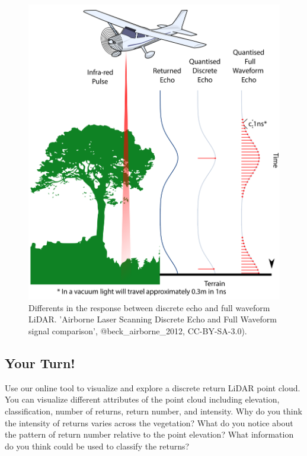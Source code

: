\documentclass[
]{book}
\begin{document}
\begin{figure}
\includegraphics[width=0.7\linewidth]{images/15-LiDAR-Discrete-Full-Waveform} \caption{Differents in the response between discrete echo and full waveform LiDAR. 'Airborne Laser Scanning Discrete Echo and Full Waveform signal comparison', @beck_airborne_2012, CC-BY-SA-3.0).}\label{fig:15-LiDAR-Discrete-Full-Waveform}
\end{figure}

\hypertarget{your-turn-8}{%
\subsection{Your Turn!}\label{your-turn-8}}

Use our online tool to visualize and explore a discrete return LiDAR point cloud. You can visualize different attributes of the point cloud including elevation, classification, number of returns, return number, and intensity. Why do you think the intensity of returns varies across the vegetation? What do you notice about the pattern of return number relative to the point elevation? What information do you think could be used to classify the returns?
\end{document}
